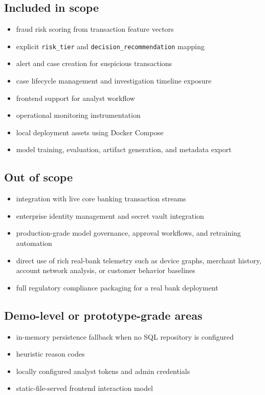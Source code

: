 \documentclass[11pt]{article}
\newcommand{\code}[1]{\texttt{#1}}
\begin{document}
\subsection*{Included in scope}
\begin{itemize}
  \item fraud risk scoring from transaction feature vectors
  \item explicit \code{risk_tier} and \code{decision_recommendation} mapping
  \item alert and case creation for suspicious transactions
  \item case lifecycle management and investigation timeline exposure
  \item frontend support for analyst workflow
  \item operational monitoring instrumentation
  \item local deployment assets using Docker Compose
  \item model training, evaluation, artifact generation, and metadata export
\end{itemize}

\subsection*{Out of scope}
\begin{itemize}
  \item integration with live core banking transaction streams
  \item enterprise identity management and secret vault integration
  \item production-grade model governance, approval workflows, and retraining automation
  \item direct use of rich real-bank telemetry such as device graphs, merchant history, account network analysis, or customer behavior baselines
  \item full regulatory compliance packaging for a real bank deployment
\end{itemize}

\subsection*{Demo-level or prototype-grade areas}
\begin{itemize}
  \item in-memory persistence fallback when no SQL repository is configured
  \item heuristic reason codes
  \item locally configured analyst tokens and admin credentials
  \item static-file-served frontend interaction model
\end{itemize}
\end{document}
